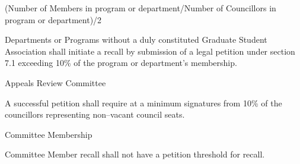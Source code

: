 \begin{longenum}[ label*=\thesubsection.\arabic*., align=left]
\begin{longenum}[ label*=\arabic*., align=left]
(Number of Members in program or department/Number of Councillors in program or department)/2
	\item Departments or Programs without a duly constituted Graduate Student Association shall initiate a recall by submission of a legal petition under section 7.1 exceeding 10\% of the program or department's membership.
	\end{longenum}    
	\item Appeals Review Committee
    \begin{longenum}[ label*=\arabic*., align=left]
		\item A successful petition shall require at a minimum signatures from 10\% of the councillors representing non--vacant council seats.
	\end{longenum}
    \item{Committee Membership}
    \begin{longenum}
    \item Committee Member recall shall not have a petition threshold for recall. 
    \end{longenum}
\end{longenum}

